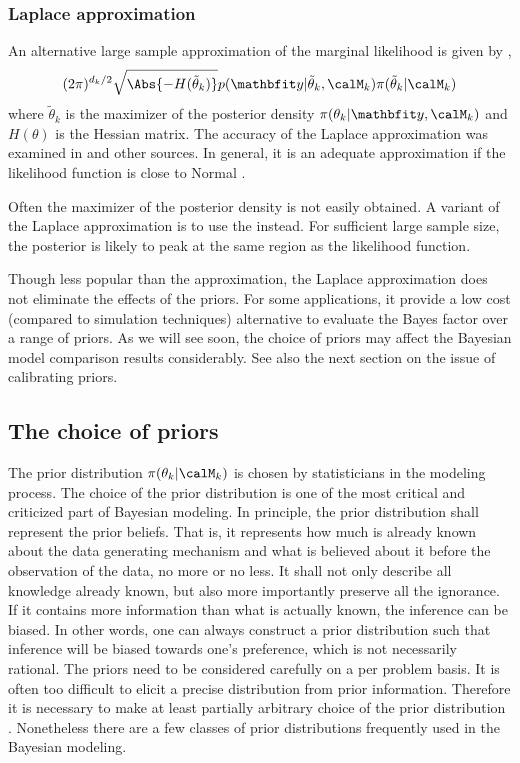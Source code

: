 

\subsubsection{Laplace approximation}
\label{ssub:Laplace approximation}

An alternative large sample approximation of the marginal likelihood is given
by \cite{Tierney:1986vx},
\begin{equation}
  (2\pi)^{d_k/2}\sqrt{\Abs{-H(\tilde\theta_k)}}
  p(\data|\tilde\theta_k,\calM_k)\pi(\tilde\theta_k|\calM_k)
\end{equation}
where $\tilde\theta_k$ is the maximizer of the posterior density
$\pi(\theta_k|\data,\calM_k)$ and $H(\theta)$ is the Hessian matrix. The
accuracy of the Laplace approximation was examined in \cite{Kass:1992tz} and
other sources. In general, it is an adequate approximation if the likelihood
function is close to Normal \cite{Kass:1995vb}.

Often the maximizer of the posterior density is not easily obtained. A
variant of the Laplace approximation is to use the \mle instead. For
sufficient large sample size, the posterior is likely to peak at the same
region as the likelihood function.

Though less popular than the \bic approximation, the Laplace approximation
does not eliminate the effects of the priors. For some applications, it
provide a low cost (compared to simulation techniques) alternative to evaluate
the Bayes factor over a range of priors. As we will see soon, the choice of
priors may affect the Bayesian model comparison results considerably. See also
the next section on the issue of calibrating priors.

\subsection{The choice of priors}
\label{sub:The choice of priors}

The prior distribution $\pi(\theta_k|\calM_k)$ is chosen by statisticians in
the modeling process. The choice of the prior distribution is one of the most
critical and criticized part of Bayesian modeling. In principle, the prior
distribution shall represent the prior beliefs. That is, it represents how
much is already known about the data generating mechanism and what is believed
about it before the observation of the data, no more or no less. It shall not
only describe all knowledge already known, but also more importantly preserve
all the ignorance. If it contains more information than what is actually
known, the inference can be biased. In other words, one can always construct a
prior distribution such that inference will be biased towards one's
preference, which is not necessarily rational. The priors need to be
considered carefully on a per problem basis. It is often too difficult to
elicit a precise distribution from prior information. Therefore it is
necessary to make at least partially arbitrary choice of the prior
distribution \cite[][chap.~3]{Robert:2007tc}\cite{Kass:1995vb}. Nonetheless
there are a few classes of prior distributions frequently used in the Bayesian
modeling.

